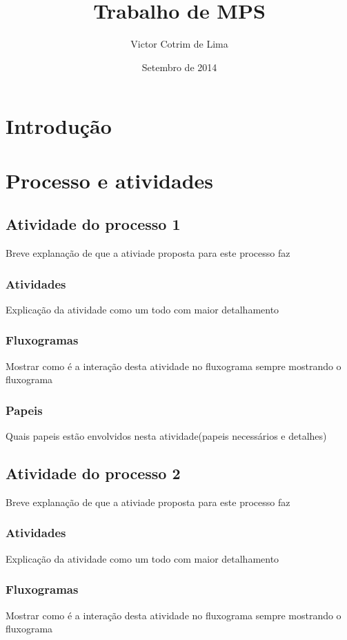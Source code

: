 \documentclass{article}
\title{Trabalho de MPS}
\author{Victor Cotrim de Lima }
\date{Setembro de 2014}
\begin{document}
\maketitle


\section{Introdução}

\section{Processo e atividades} 

	\subsection{Atividade do processo 1}
		Breve explanação de que a ativiade proposta para este processo faz
		
		\subsubsection{Atividades}
			Explicação da atividade como um todo com maior detalhamento
		\subsubsection{Fluxogramas}
			Mostrar como é a interação desta atividade no fluxograma sempre mostrando o fluxograma
		\subsubsection{Papeis}
			Quais papeis estão envolvidos nesta atividade(papeis necessários e detalhes)

	\subsection{Atividade do processo 2}
		Breve explanação de que a ativiade proposta para este processo faz
		
		\subsubsection{Atividades}
			Explicação da atividade como um todo com maior detalhamento
		\subsubsection{Fluxogramas}
			Mostrar como é a interação desta atividade no fluxograma sempre mostrando o fluxograma
\end{document}
